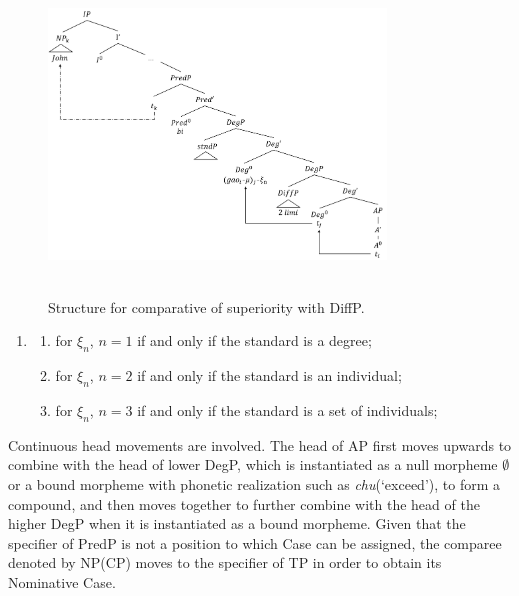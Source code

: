 \documentclass{ctexart}
\begin{document}
\begin{figure}[H]
    \centering
    \includegraphics[width=0.8\textwidth]{Pic/superiority_structure_diff.png}
    \begin{caption}
        \\ \vspace{-1.1ex}
        Structure for comparative of superiority with DiffP.
    \end{caption}
\end{figure}

\begin{enumerate}
    \item \label{superiority_example_10}
    \begin{enumerate}
        \item \label{superiority_example_10_a}
        for $\xi_n$, $n=1$ if and only if the standard is a degree;

        \item \label{superiority_example_10_b}
        for $\xi_n$, $n=2$ if and only if the standard is an individual;

        \item \label{superiority_example_10_c}
        for $\xi_n$, $n=3$ if and only if the standard is a set of individuals;

    \end{enumerate}
\end{enumerate}

Continuous head movements are involved. The head of AP first moves upwards to combine with the head of lower DegP, which is instantiated as a null morpheme $\emptyset$ or a bound morpheme with phonetic realization such as \textit{chu}(`exceed'), to form a compound, and then moves together to further combine with the head of the higher DegP when it is instantiated as a bound morpheme. Given that the specifier of PredP is not a position to which Case can be assigned, the comparee denoted by NP(CP) moves to the specifier of TP in order to obtain its Nominative Case.
\end{document}
